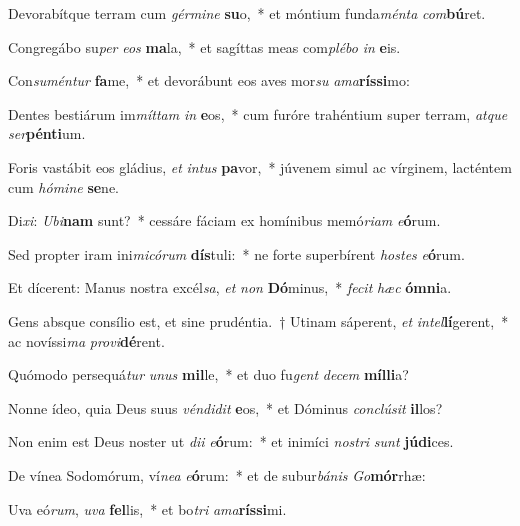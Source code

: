 \item Devorabítque terram cum \textit{gér}\textit{mi}\textit{ne} \textbf{su}o,~* et móntium funda\textit{mén}\textit{ta} \textit{com}\textbf{bú}ret.
\item Congregábo su\textit{per} \textit{e}\textit{os} \textbf{ma}la,~* et sagíttas meas com\textit{plé}\textit{bo} \textit{in} \textbf{e}is.
\item Con\textit{su}\textit{mén}\textit{tur} \textbf{fa}me,~* et devorábunt eos aves mor\textit{su} \textit{a}\textit{ma}\textbf{rís}\textbf{si}mo:
\item Dentes bestiárum im\textit{mít}\textit{tam} \textit{in} \textbf{e}os,~* cum furóre trahéntium super terram, \textit{at}\textit{que} \textit{ser}\textbf{pén}\textbf{ti}um.
\item Foris vastábit eos gládius, \textit{et} \textit{in}\textit{tus} \textbf{pa}vor,~* júvenem simul ac vírginem, lacténtem cum \textit{hó}\textit{mi}\textit{ne} \textbf{se}ne.
\item Di\textit{xi}: \textit{U}\textit{bi}\textbf{nam} sunt?~* cessáre fáciam ex homínibus memó\textit{ri}\textit{am} \textit{e}\textbf{ó}rum.
\item Sed propter iram ini\textit{mi}\textit{có}\textit{rum} \textbf{dís}tuli:~* ne forte superbírent \textit{hos}\textit{tes} \textit{e}\textbf{ó}rum.
\item Et dícerent: Manus nostra excél\textit{sa}, \textit{et} \textit{non} \textbf{Dó}minus,~* \textit{fe}\textit{cit} \textit{hæc} \textbf{óm}\textbf{ni}a.
\item Gens absque consílio est, et sine prudéntia.~† Utinam sáperent, \textit{et} \textit{in}\textit{tel}\textbf{lí}gerent,~* ac novíssi\textit{ma} \textit{pro}\textit{vi}\textbf{dé}rent.
\item Quómodo persequá\textit{tur} \textit{u}\textit{nus} \textbf{mil}le,~* et duo fu\textit{gent} \textit{de}\textit{cem} \textbf{míl}\textbf{li}a?
\item Nonne ídeo, quia Deus suus \textit{vén}\textit{di}\textit{dit} \textbf{e}os,~* et Dóminus \textit{con}\textit{clú}\textit{sit} \textbf{il}los?
\item Non enim est Deus noster ut \textit{di}\textit{i} \textit{e}\textbf{ó}rum:~* et inimíci \textit{nos}\textit{tri} \textit{sunt} \textbf{jú}\textbf{di}ces.
\item De vínea Sodomórum, ví\textit{ne}\textit{a} \textit{e}\textbf{ó}rum:~* et de subur\textit{bá}\textit{nis} \textit{Go}\textbf{mór}rhæ:
\item Uva eó\textit{rum}, \textit{u}\textit{va} \textbf{fel}lis,~* et bo\textit{tri} \textit{a}\textit{ma}\textbf{rís}\textbf{si}mi.
